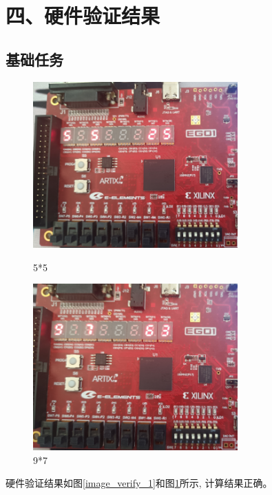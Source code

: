 \documentclass{article}
\newcommand{\fourhao}{\fontsize{14pt}{\baselineskip}\selectfont} %
\newcommand{\xiaosihao}{\fontsize{12pt}{\baselineskip}\selectfont} %
\begin{document}
\section*{\fourhao 四、硬件验证结果}
\xiaosihao
{}
\subsection*{基础任务}
\begin{figure}[H]
    \begin{minipage}[t]{0.45\linewidth}
        \centering
        \includegraphics[width=0.7\textwidth]{image/2024-06-24-11-04-31.png}
        \caption{5*5}
        \label{image_verify_1}
    \end{minipage}
    \begin{minipage}[t]{0.45\linewidth}
        \centering
        \includegraphics[width=0.7\textwidth]{image/2024-06-24-11-04-56.png}
        \caption{9*7}
        \label{image_verify_2}
    \end{minipage}
\end{figure}
硬件验证结果如图\ref{image_verify_1}和图\ref{image_verify_2}所示, 计算结果正确。
\end{document}
